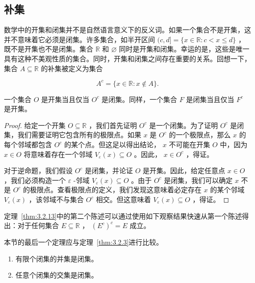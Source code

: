 \subsection{补集}

数学中的开集和闭集并不是自然语言意义下的反义词。如果一个集合不是开集，这并不意味着它必须是闭集。许多集合，如半开区间 \((c,d\rbrack  = \{ x \in  \mathbb{R} : c < x \leq  d\}\) ，既不是开集也不是闭集。集合 \(\mathbb{R}\) 和 \(\varnothing\) 同时是开集和闭集。幸运的是，这些是唯一具有这种不美观性质的集合。同时，开集和闭集之间存在重要的关系。回想一下，集合 \(A \subseteq  \mathbb{R}\) 的补集被定义为集合

\[
{A}^{c} = \{ x \in  \mathbb{R} : x \notin  A\} .
\]

\begin{Thm}
  \label{thm:3.2.13}
  一个集合 \(O\) 是开集当且仅当 \({O}^{c}\) 是闭集。同样，一个集合 \(F\) 是闭集当且仅当 \({F}^{c}\) 是开集。
\end{Thm}

\begin{proof}
给定一个开集 \(O \subseteq  \mathbb{R}\) ，我们首先证明 \({O}^{c}\) 是一个闭集。为了证明 \({O}^{c}\) 是闭集，我们需要证明它包含所有的极限点。如果 \(x\) 是 \({O}^{c}\) 的一个极限点，那么 \(x\) 的每个邻域都包含 \({O}^{c}\) 的某个点。但这足以得出结论， \(x\) 不可能在开集 \(O\) 中，因为 \(x \in  O\) 将意味着存在一个邻域 \({V}_{\varepsilon }\left( x\right)  \subseteq  O\) 。因此， \(x \in  {O}^{c}\) ，得证。

对于逆命题，我们假设 \({O}^{c}\) 是闭集，并论证 \(O\) 是开集。因此，给定任意点 \(x \in  O\) ，我们必须构造一个 \(\varepsilon\) -邻域 \({V}_{\varepsilon }\left( x\right)  \subseteq  O\) 。由于 \({O}^{c}\) 是闭集，我们可以确定 \(x\) 不是 \({O}^{c}\) 的极限点。查看极限点的定义，我们发现这意味着必定存在 \(x\) 的某个邻域 \({V}_{\varepsilon }\left( x\right)\) ，该邻域不与集合 \({O}^{c}\) 相交。但这意味着 \({V}_{\varepsilon }\left( x\right)  \subseteq  O\) ，得证。
  
\end{proof}

定理~\ref{thm:3.2.13}中的第二个陈述可以通过使用如下观察结果快速从第一个陈述得出：对于任何集合 \(E \subseteq  \mathbb{R}\) ， \({\left( {E}^{c}\right) }^{c} = E\) 成立。

本节的最后一个定理应与定理~\ref{thm:3.2.3}进行比较。

\begin{Thm}
  \label{thm:3.2.14}
  \begin{enumerate}
  \item 有限个闭集的并集是闭集。
  \item 任意个闭集的交集是闭集。
  \end{enumerate}
\end{Thm}

